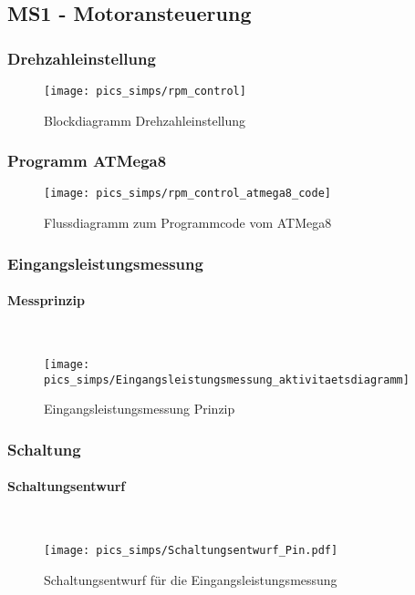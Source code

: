 \documentclass[12pt,a4paper]{article}
\begin{document}
\subsection{MS1 - Motoransteuerung}
%
\subsubsection{Drehzahleinstellung}
\begin{figure}[h!]
	\centering
	\texttt{[image: pics\_simps/rpm\_control]}
	\caption{Blockdiagramm Drehzahleinstellung}
\end{figure}
%
\subsubsection{Programm ATMega8}
\begin{figure}[h!]
	\centering
	\texttt{[image: pics\_simps/rpm\_control\_atmega8\_code]}
	\caption{Flussdiagramm zum Programmcode vom ATMega8}
\end{figure}
%
%
\newpage
\subsubsection{Eingangsleistungsmessung}
\paragraph{Messprinzip}\mbox{}\\
\begin{figure}[h!]
	\centering
	\texttt{[image: pics\_simps/Eingangsleistungsmessung\_aktivitaetsdiagramm]}
	\caption{Eingangsleistungsmessung Prinzip}
\end{figure}
%
%
\newpage
\subsubsection{Schaltung}
\paragraph{Schaltungsentwurf}\mbox{}\\
\begin{figure}[h!]
	\centering
	\texttt{[image: pics\_simps/Schaltungsentwurf\_Pin.pdf]}
	\caption{Schaltungsentwurf für die Eingangsleistungsmessung}
\end{figure}
%
%
\newpage
\end{document}
